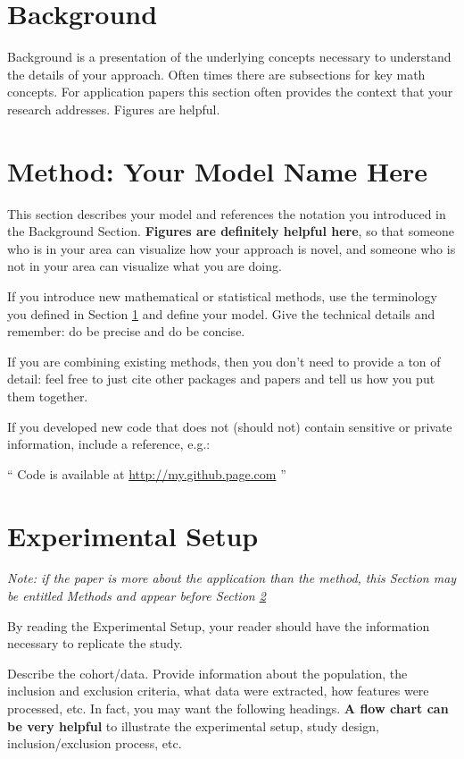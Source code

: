 \documentclass[twoside,11pt]{article}
\begin{document}
\section{Background} \label{background}
Background is a presentation of the underlying concepts necessary to understand the details of your approach. Often times there are subsections for key math concepts. For application papers this section often provides the context that your research addresses. Figures are helpful.

\section{Method: Your Model Name Here} \label{model}
This section describes your model and references the notation you introduced in the Background Section. \textbf{Figures are definitely helpful here}, so that someone who is in your area can visualize how your approach is novel, and someone who is not in your area can visualize what you are doing.

If you introduce new mathematical or statistical methods, use the terminology you defined in Section \ref{background} and define your model. Give the technical details and remember: do be precise and do be concise.

If you are combining existing methods, then you don't need to provide a ton of detail: feel free to just cite other packages and papers and tell us how you put them together.  

If you developed new code that does not (should not) contain sensitive or private information, include a reference, e.g.:

`` Code is available at \url{http://my.github.page.com} ''

\section{Experimental Setup} \label{experiment}
\emph{Note: if the paper is more about the application than the method, this Section may be entitled Methods and appear before Section \ref{model}}

By reading the Experimental Setup, your reader should have the information necessary to replicate the study.

Describe the cohort/data. Provide information about the population, the inclusion and exclusion criteria, what data were extracted, how features were processed, etc. In fact, you may want the following headings. \textbf{A flow chart can be very helpful} to illustrate the experimental setup, study design, inclusion/exclusion process, etc.
\end{document}
